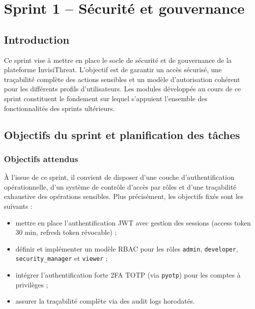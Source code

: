 \chapter{Sprint 1 -- Sécurité et gouvernance}

\section{Introduction}
Ce sprint vise à mettre en place le socle de sécurité et de gouvernance de la plateforme InvisiThreat. L'objectif est de garantir un accès sécurisé, une traçabilité complète des actions sensibles et un modèle d'autorisation cohérent pour les différents profils d'utilisateurs. Les modules développés au cours de ce sprint constituent le fondement sur lequel s'appuient l'ensemble des fonctionnalités des sprints ultérieurs.

\section{Objectifs du sprint et planification des tâches}

\subsection{Objectifs attendus}
À l'issue de ce sprint, il convient de disposer d'une couche d'authentification opérationnelle, d'un système de contrôle d'accès par rôles et d'une traçabilité exhaustive des opérations sensibles. Plus précisément, les objectifs fixés sont les suivants :
\begin{itemize}
  \item mettre en place l'authentification JWT avec gestion des sessions (access token 30 min, refresh token révocable) ;
  \item définir et implémenter un modèle RBAC pour les rôles \texttt{admin}, \texttt{developer}, \texttt{security\_manager} et \texttt{viewer} ;
  \item intégrer l'authentification forte 2FA TOTP (via \texttt{pyotp}) pour les comptes à privilèges ;
  \item assurer la traçabilité complète via des audit logs horodatés.
\end{itemize}

